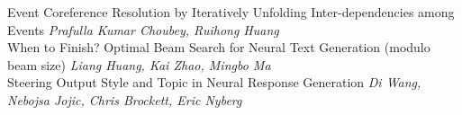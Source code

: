 \documentclass{book}
\begin{document}
    \noindent	Event Coreference Resolution by Iteratively Unfolding Inter-dependencies among Events \newline 
    {\itshape Prafulla Kumar Choubey, Ruihong Huang} \\
    
    \noindent	When to Finish? Optimal Beam Search for Neural Text Generation (modulo beam size) \newline 
    {\itshape Liang Huang, Kai Zhao, Mingbo Ma} \\
    
    \noindent	Steering Output Style and Topic in Neural Response Generation \newline 
    {\itshape Di Wang, Nebojsa Jojic, Chris Brockett, Eric Nyberg} \\
    
\vspace*{\fill}
\end{document}
